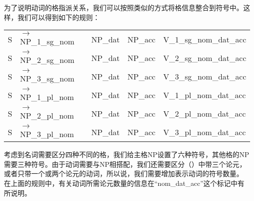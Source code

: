 为了说明动词的格指派关系，我们可以按照类似的方式将格信息整合到符号中。这样，我们可以得到如下的规则：
\ea
\label{ditrans-ps-regeln}
\begin{tabular}[t]{@{}l@{ }l@{~~}l@{~~}l@{~~}l}
S  & $\to$ NP\_1\_sg\_nom & NP\_dat & NP\_acc & V\_1\_sg\_nom\_dat\_acc\\
S  & $\to$ NP\_2\_sg\_nom & NP\_dat & NP\_acc & V\_2\_sg\_nom\_dat\_acc\\
S  & $\to$ NP\_3\_sg\_nom & NP\_dat & NP\_acc & V\_3\_sg\_nom\_dat\_acc\\
S  & $\to$ NP\_1\_pl\_nom & NP\_dat & NP\_acc & V\_1\_pl\_nom\_dat\_acc\\
S  & $\to$ NP\_2\_pl\_nom & NP\_dat & NP\_acc & V\_2\_pl\_nom\_dat\_acc\\
S  & $\to$ NP\_3\_pl\_nom & NP\_dat & NP\_acc & V\_3\_pl\_nom\_dat\_acc\\
\end{tabular}
\z
考虑到名词需要区分四种不同的格，我们给主格NP设置了六种符号，其他格的NP需要三种符号。由于动词需要与NP相搭配，我们还需要区分（）中带三个论元，或者只带一个或两个论元的动词，所以说，我们需要增加表示动词的符号数量。
\eal
{}
\zl
在上面的规则中，有关动词所需论元数量的信息在“nom\_dat\_acc”这个标记中有所说明。


